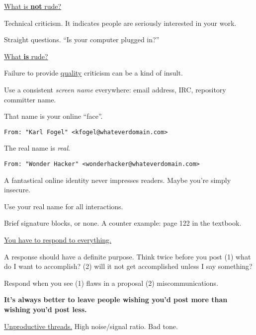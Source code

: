 \documentclass[landscape,30pt]{foils}
\begin{document}

\underline{What is {\bf not} rude?}

Technical criticism. It indicates people are seriously interested in your work.

Straight questions.  ``Is your computer plugged in?''

\underline{What {\bf is} rude?}

Failure to provide \underline{quality} criticism can be a kind of insult.


Use a consistent {\em screen name} everywhere: email address, IRC, repository committer name.

That name is your online ``face''.

\begin{verbatim}
From: "Karl Fogel" <kfogel@whateverdomain.com>
\end{verbatim}

The real name is {\em real}.

\begin{verbatim}
From: "Wonder Hacker" <wonderhacker@whateverdomain.com>
\end{verbatim}

A fantastical online identity never impresses readers.   Maybe you're simply insecure.

Use your real name for all interactions.

Brief signature blocks, or none.  A counter example: page 122 in the textbook.



\underline{You have to respond to everything.}

A response should have a definite purpose.  Think twice before you post (1) what do I want to accomplish? (2) will it not get accomplished unless I say something?

Respond when you see (1) flaws in a proposal (2) miscommunications.

{\bf It's always better to leave people wishing you'd post more than wishing you'd post less.}

\underline{Unproductive threads.}  High noise/signal ratio.  Bad tone.
\end{document}
